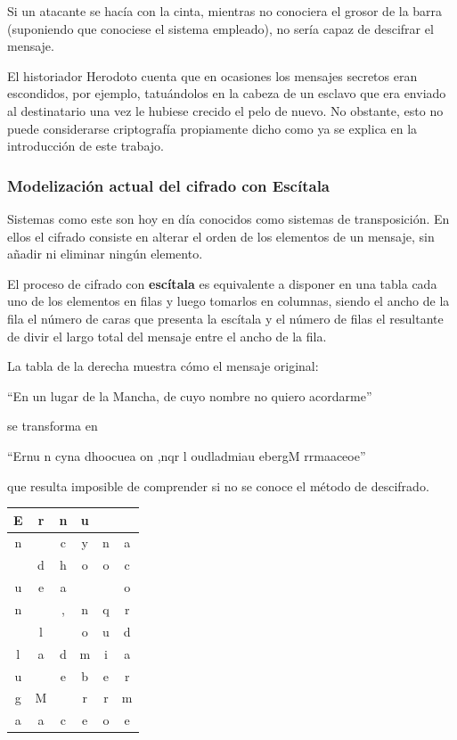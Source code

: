 \documentclass[nochap]{apuntesURJC}
\begin{document}
Si un atacante se hacía con la cinta, mientras no conociera el grosor de la barra (suponiendo que conociese el sistema empleado), no sería capaz de descifrar el mensaje.

El historiador Herodoto cuenta que en ocasiones los mensajes secretos eran escondidos, por ejemplo, tatuándolos en la cabeza de un esclavo que era enviado al destinatario una vez le hubiese crecido el pelo de nuevo. No obstante, esto no puede considerarse criptografía propiamente dicho como ya se explica en la introducción de este trabajo.

\subsubsection{Modelización actual del cifrado con Escítala}
Sistemas como este son hoy en día conocidos como sistemas de transposición. En ellos el cifrado consiste en alterar el orden de los elementos de un mensaje, sin añadir ni eliminar ningún elemento.

El proceso de cifrado con \textbf{escítala} es equivalente a disponer en una tabla cada uno de los elementos en filas y luego tomarlos en columnas, siendo el ancho de la fila el número de caras que presenta la escítala y el número de filas el resultante de divir el largo total del mensaje entre el ancho de la fila.

\begin{minipage}{0.65\textwidth}
La tabla de la derecha muestra cómo el mensaje original:
\begin{center}
``En un lugar de la Mancha, de cuyo nombre no quiero acordarme''
\end{center}
se transforma en
\begin{center}
``Ernu  n cyna dhoocuea  on ,nqr l oudladmiau ebergM rrmaaceoe''
\end{center}
que resulta imposible de comprender si no se conoce el método de descifrado.

\end{minipage}
\begin{minipage}{0.3\textwidth}

\end{minipage}
\begin{minipage}{0.30\textwidth}
\begin{center}
\begin{tabular}{|c|c|c|c|c|c|}
\hline
E & r & n & u &   &   \\
\hline
n &   & c & y & n & a \\
\hline
  & d & h & o & o & c \\
\hline
u & e & a &   &   & o \\
\hline
n &   & , & n & q & r \\
\hline
  & l &   & o & u & d \\
\hline
l & a & d & m & i & a \\
\hline
u &   & e & b & e & r \\
\hline
g & M &   & r & r & m \\
\hline
a & a & c & e & o & e \\
\hline
\end{tabular}
\end{center}
\end{minipage}
\end{document}
